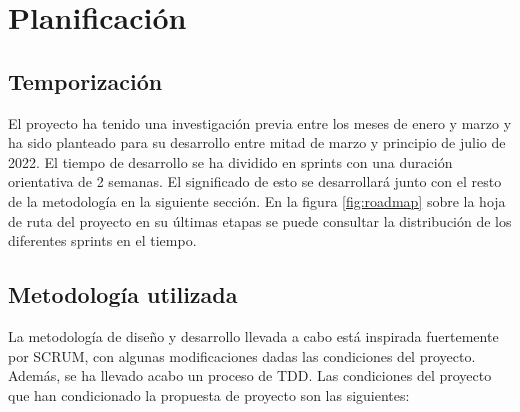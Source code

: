 \chapter{Planificación} 

\section{Temporización}

El proyecto ha tenido una investigación previa entre los meses de enero y marzo y ha sido planteado para su desarrollo entre mitad de marzo y principio de julio de 2022. El tiempo de desarrollo se ha dividido en sprints con una duración orientativa de 2 semanas. El significado de esto se desarrollará junto con el resto de la metodología en la siguiente sección. En la figura \ref{fig:roadmap} sobre la hoja de ruta del proyecto en su últimas etapas se puede consultar la distribución de los diferentes sprints en el tiempo.

\section{Metodología utilizada}

La metodología de diseño y desarrollo llevada a cabo está inspirada fuertemente por SCRUM, con algunas modificaciones dadas las condiciones del proyecto. Además, se ha llevado acabo un proceso de TDD. Las condiciones del proyecto que han condicionado la propuesta de proyecto son las siguientes:

